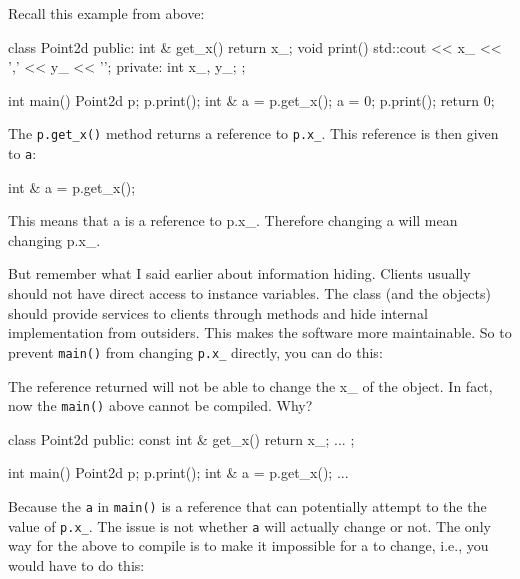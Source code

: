 \newpage{}

Recall this example from above:

\begin{consolethree}[escapeinside=||]
class Point2d
{
public:
    int & get_x()
    {
        return x_;
    }
    void print()
    {
        std::cout << x_ << ',' << y_ << '\n';
    }
private:
    int x_, y_;
};

int main()
{
    Point2d p;
    p.print();
    int & a = p.get_x();
    a = 0;
    p.print();
    return 0;
}
\end{consolethree}

The \texttt{p.get\_x()} method returns a reference to \texttt{p.x\_}. This
reference is then given to \texttt{a}:

\begin{consolethree}[escapeinside=||]
int & a = p.get_x();
\end{consolethree}

This means that a is a reference to p.x\_. Therefore changing a will
mean changing p.x\_.

But remember what I said earlier about information hiding. Clients
usually should not have direct access to instance variables. The class
(and the objects) should provide services to clients through methods and
hide internal implementation from outsiders. This makes the software
more maintainable. So to prevent \texttt{main()} from changing
\texttt{p.x\_} directly, you can do this:

\begin{consolethree}[escapeinside=||]
class Point2d
{
public:
    || int & get_x()
    {
        return x_;
    }
    ...
\end{consolethree}

The reference returned will not be able to change the x\_ of the object.
In fact, now the \texttt{main()} above cannot be compiled. Why?

\begin{consolethree}[escapeinside=||]
class Point2d
{
public:
    const int & get_x()
    {
        return x_;
    }
    ...
};

int main()
{
    Point2d p;
    p.print();
    int & a = p.get_x();
    ...
}
\end{consolethree}

Because the \texttt{a} in \texttt{main()} is a reference that can
potentially attempt to the the value of \texttt{p.x\_}. The issue is not
whether \texttt{a} will actually change or not. The only way for the above
to compile is to make it impossible for a to change, i.e., you would
have to do this:


